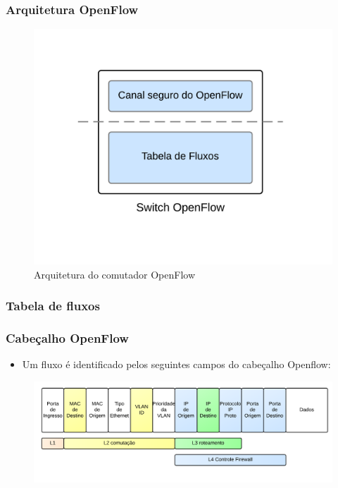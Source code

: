 %
%
\begin{frame}\frametitle{Arquitetura OpenFlow}

    \begin{figure}[h!]
        \centering
        \label{fig:switch-arch}
        \includegraphics[width=\linewidth]{images/switch-architecture}
        \caption{Arquitetura do comutador OpenFlow}
    \end{figure}

\end{frame}



%
%
\begin{frame}\frametitle{Tabela de fluxos}
    
\end{frame}

%
%
\begin{frame}\frametitle{Cabeçalho OpenFlow}

    \begin{itemize}
    \item Um fluxo é identificado pelos seguintes campos do cabeçalho 
          Openflow:
    \end{itemize}
	\begin{figure}[h]\hspace*{-1.2cm}
        \centering
        \includegraphics[width=\linewidth]{images/openflow-header}
    \end{figure}
\end{frame}



